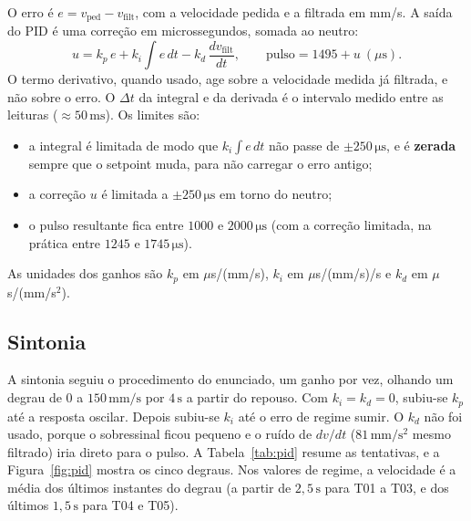 \documentclass[11pt,a4paper]{article}
\newcommand{\unid}[1]{\,\mathrm{#1}}
\begin{document}
O erro é $e = v_{\mathrm{ped}} - v_{\mathrm{filt}}$, com a velocidade pedida e a filtrada em mm/s. A saída do PID é uma correção em microssegundos, somada ao neutro:
\begin{equation}
  u = k_p\,e + k_i \int e\,dt - k_d\,\frac{dv_{\mathrm{filt}}}{dt}, \qquad
  \text{pulso} = 1495 + u\ (\mu\text{s}).
\end{equation}
O termo derivativo, quando usado, age sobre a velocidade medida já filtrada, e não sobre o erro. O $\Delta t$ da integral e da derivada é o intervalo medido entre as leituras ($\approx 50\unid{ms}$). Os limites são:
\begin{itemize}[nosep]
  \item a integral é limitada de modo que $k_i \int e\,dt$ não passe de $\pm 250\unid{\mu s}$, e é \textbf{zerada} sempre que o setpoint muda, para não carregar o erro antigo;
  \item a correção $u$ é limitada a $\pm 250\unid{\mu s}$ em torno do neutro;
  \item o pulso resultante fica entre $1000$ e $2000\unid{\mu s}$ (com a correção limitada, na prática entre $1245$ e $1745\unid{\mu s}$).
\end{itemize}
As unidades dos ganhos são $k_p$ em $\mu$s/(mm/s), $k_i$ em $\mu$s/(mm/s)/s e $k_d$ em $\mu$s/(mm/s$^2$).

\subsection{Sintonia}

A sintonia seguiu o procedimento do enunciado, um ganho por vez, olhando um degrau de $0$ a $150\unid{mm/s}$ por $4\unid{s}$ a partir do repouso. Com $k_i = k_d = 0$, subiu-se $k_p$ até a resposta oscilar. Depois subiu-se $k_i$ até o erro de regime sumir. O $k_d$ não foi usado, porque o sobressinal ficou pequeno e o ruído de $dv/dt$ ($81\unid{mm/s^2}$ mesmo filtrado) iria direto para o pulso. A Tabela~\ref{tab:pid} resume as tentativas, e a Figura~\ref{fig:pid} mostra os cinco degraus. Nos valores de regime, a velocidade é a média dos últimos instantes do degrau (a partir de $2{,}5\unid{s}$ para T01 a T03, e dos últimos $1{,}5\unid{s}$ para T04 e T05).
\end{document}

